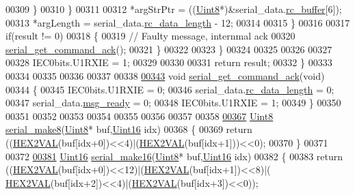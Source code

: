 \begin{DoxyCode}
00309                 \}
00310             \}
00311 
00312             *argStrPtr =  ((\hyperlink{a00072_af84840501dec18061d18a68c162a8fa2}{Uint8}*)&serial\_data.\hyperlink{a00030_ac734cb8be27f86bd99edc539434883a4}{rc\_buffer}[6]);
00313             *argLength = serial\_data.\hyperlink{a00030_ab136d4fef2c523afd55b6ca74c46d7cc}{rc\_data\_length} - 12;
00314 
00315        \}
00316 
00317        \textcolor{keywordflow}{if}(result != 0)
00318        \{
00319             \textcolor{comment}{// Faulty message, internmal ack}
00320             \hyperlink{a00030_a7fc7421ed15d6e4516e9878e7455d715}{serial\_get\_command\_ack}();
00321        \}
00322 
00323     \}
00324 
00325 
00326 
00327 
00328     IEC0bits.U1RXIE = 1;
00329 
00330 
00331     \textcolor{keywordflow}{return} result;
00332 \}
00333 
00334 
00335 
00336 
00337 
00338 
\hypertarget{a00030_source_l00343}{}\hyperlink{a00030_a7fc7421ed15d6e4516e9878e7455d715}{00343} \textcolor{keywordtype}{void}  \hyperlink{a00030_a7fc7421ed15d6e4516e9878e7455d715}{serial\_get\_command\_ack}(\textcolor{keywordtype}{void})
00344 \{
00345     IEC0bits.U1RXIE = 0;
00346     serial\_data.\hyperlink{a00030_ab136d4fef2c523afd55b6ca74c46d7cc}{rc\_data\_length} = 0;
00347     serial\_data.\hyperlink{a00030_ac0789a6c9ab7ccd13d6f04ae31496854}{msg\_ready} = 0;
00348     IEC0bits.U1RXIE = 1;
00349 \}
00350 
00351 
00352 
00353 
00354 
00355 
00356 
00357 
00358 
\hypertarget{a00030_source_l00367}{}\hyperlink{a00030_aa76f5237babd71f1484bb2dbc6aa0f8d}{00367} \hyperlink{a00072_af84840501dec18061d18a68c162a8fa2}{Uint8}  \hyperlink{a00030_aa76f5237babd71f1484bb2dbc6aa0f8d}{serial\_make8}(\hyperlink{a00072_af84840501dec18061d18a68c162a8fa2}{Uint8}* buf,\hyperlink{a00072_a59a9f6be4562c327cbfb4f7e8e18f08b}{Uint16} idx)
00368 \{
00369     \textcolor{keywordflow}{return} ((\hyperlink{a00030_a428b04d2e2f2da2ea031a6c731660a71}{HEX2VAL}(buf[idx+0])<<4)|(\hyperlink{a00030_a428b04d2e2f2da2ea031a6c731660a71}{HEX2VAL}(buf[idx+1]))<<0);
00370 \}
00371 
00372 
\hypertarget{a00030_source_l00381}{}\hyperlink{a00030_abc17de32f14103a5be219df0d4ad9176}{00381} \hyperlink{a00072_a59a9f6be4562c327cbfb4f7e8e18f08b}{Uint16}  \hyperlink{a00030_abc17de32f14103a5be219df0d4ad9176}{serial\_make16}(\hyperlink{a00072_af84840501dec18061d18a68c162a8fa2}{Uint8}* buf,\hyperlink{a00072_a59a9f6be4562c327cbfb4f7e8e18f08b}{Uint16} idx)
00382 \{
00383     \textcolor{keywordflow}{return} ((\hyperlink{a00030_a428b04d2e2f2da2ea031a6c731660a71}{HEX2VAL}(buf[idx+0])<<12)|(\hyperlink{a00030_a428b04d2e2f2da2ea031a6c731660a71}{HEX2VAL}(buf[idx+1])<<8)|(
      \hyperlink{a00030_a428b04d2e2f2da2ea031a6c731660a71}{HEX2VAL}(buf[idx+2])<<4)|(\hyperlink{a00030_a428b04d2e2f2da2ea031a6c731660a71}{HEX2VAL}(buf[idx+3])<<0));

\end{DoxyCode}
